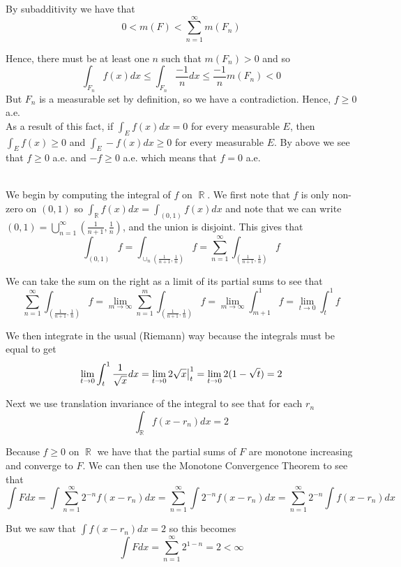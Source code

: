 \documentclass{article}
\DeclareMathOperator{\R}{\mathbb{R}}
\newcommand{\problem}[1]{\noindent{\textbf{Problem #1}}\\}
\begin{document}
By subadditivity we have that 
\[
0 < m(F) < \sum_{n=1}^\infty m(F_n)
\]

Hence, there must be at least one $n$ such that $m(F_n) > 0$ and so
\[
\int_{F_n} f(x)dx \leq \int_{F_n} \frac{-1}{n} dx \leq \frac{-1}{n}m(F_n) < 0
\]
But $F_n$ is a measurable set by definition, so we have a contradiction. Hence, $f \geq 0$ a.e. \\
\indent As a result of this fact, if $\int_E f(x)dx = 0$ for every measurable $E$, then $\int_E f(x) \geq 0$ and $\int_E -f(x)dx \geq 0$ for every measurable $E$. By above we see that $f \geq 0$ a.e. and $-f \geq 0$ a.e. which means that $f = 0$ a.e. 

\problem{2.5.15} We begin by computing the integral of $f$ on $\R$. We first note that $f$ is only non-zero on $(0,1)$ so $\int_{\R} f(x)dx = \int_{(0,1)} f(x)dx$ and note that we can write $(0,1) = \bigcup_{n=1}^\infty (\frac{1}{n+1}, \frac{1}{n})$, and the union is disjoint. This gives that
\[
\int_{(0,1)} f = \int_{\cup_n (\frac{1}{n+1}, \frac{1}{n})} f = \sum_{n=1}^\infty \int_{(\frac{1}{n+1}, \frac{1}{n})} f 
\]

We can take the sum on the right as a limit of its partial sums to see that
\[
\sum_{n=1}^\infty \int_{(\frac{1}{n+1}, \frac{1}{n})} f  = \lim_{m\to\infty}\sum_{n=1}^m \int_{(\frac{1}{n+1}, \frac{1}{n})} f = \lim_{m\to\infty}\int_{m+1}^1 f = \lim_{t \to 0}\int_t^1 f 
\]

We then integrate in the usual (Riemann) way because the integrals must be equal to get
\[
\lim_{t\to 0}\int_t^1\frac{1}{\sqrt{x}}dx = \lim_{t\to 0} 2\sqrt{x}\big{|}_t^1 = \lim_{t\to 0}2(1 - \sqrt{t}) = 2
\]

Next we use translation invariance of the integral to see that for each $r_n$
\[
\int_{\R} f(x-r_n)dx = 2
\]

Because $f \geq 0$ on $\R$ we have that the partial sums of $F$ are monotone increasing and converge to $F$. We can then use the Monotone Convergence Theorem to see that 
\[
\int Fdx = \int \sum_{n=1}^\infty 2^{-n}f(x - r_n) dx = \sum_{n=1}^\infty \int 2^{-n}f(x - r_n)dx = \sum_{n=1}^\infty 2^{-n}\int f(x - r_n)dx
\]

But we saw that $\int f(x - r_n)dx = 2$ so this becomes
\[
\int Fdx = \sum_{n=1}^\infty 2^{1-n} = 2 < \infty
\]
\end{document}
